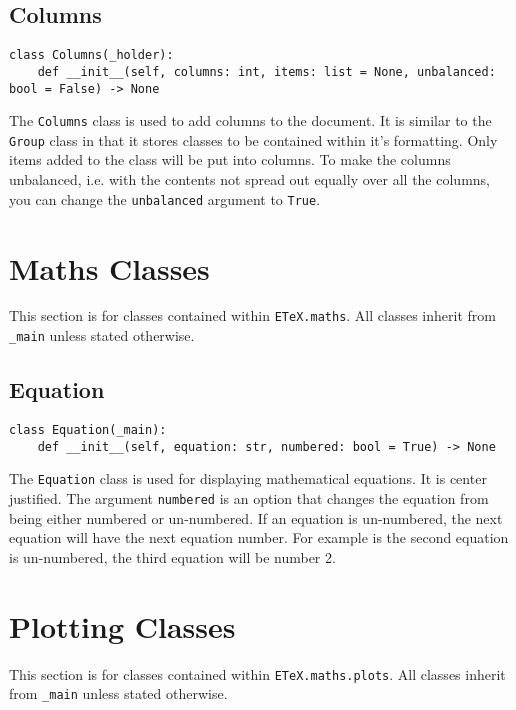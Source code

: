 \documentclass{article}
\begin{document}
\subsection{Columns}\label{subsec:columns}
\begin{verbatim}
class Columns(_holder):
	def __init__(self, columns: int, items: list = None, unbalanced: bool = False) -> None
\end{verbatim}
The \verb|Columns| class is used to add columns to the document. It is similar to the \verb|Group| class in that it stores classes to be contained within it's formatting. Only items added to the class will be put into columns. To make the columns unbalanced, i.e. with the contents not spread out equally over all the columns, you can change the \verb|unbalanced| argument to \verb|True|.
\section{Maths Classes}\label{sec:maths_classes}
This section is for classes contained within \verb|ETeX.maths|. All classes inherit from \verb|_main| unless stated otherwise.
\subsection{Equation}\label{subsec:equation}
\begin{verbatim}
class Equation(_main):
	def __init__(self, equation: str, numbered: bool = True) -> None
\end{verbatim}
The \verb|Equation| class is used for displaying mathematical equations. It is center justified. The argument \verb|numbered| is an option that changes the equation from being either numbered or un-numbered. If an equation is un-numbered, the next equation will have the next equation number. For example is the second equation is un-numbered, the third equation will be number 2.
\section{Plotting Classes}\label{sec:plotting_classes}
This section is for classes contained within \verb|ETeX.maths.plots|. All classes inherit from \verb|_main| unless stated otherwise.
\end{document}
